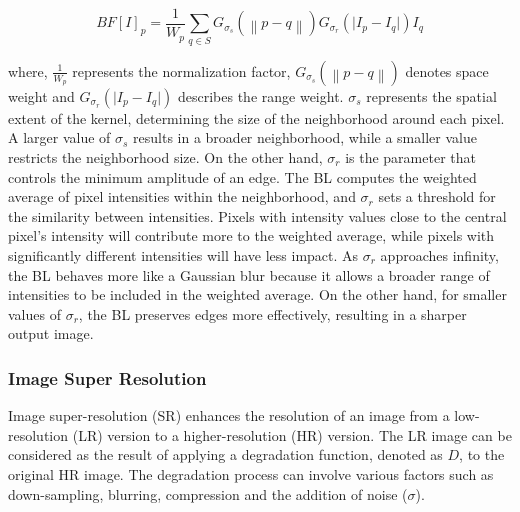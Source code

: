\documentclass[sn-mathphys]{sn-jnl}%
\theoremstyle{thmstyleone}%
\theoremstyle{thmstyletwo}%
\theoremstyle{thmstylethree}%
\begin{document}
 \begin{equation} \label{bl:eq:1}
  BF[I]_p = \frac{1}{W_p} \sum_{q \in S} G_{\sigma_s} (\left\| p - q \right\| ) G_{\sigma_r} ( \lvert I_p - I_q \rvert ) I_q
 \end{equation}
 
 where, $\frac{1}{W_p}$ represents the normalization factor,  $G_{\sigma_s} (\left\| p - q \right\| )$ denotes space weight and $G_{\sigma_r} ( \lvert I_p - I_q \rvert )$ describes the range weight. $\sigma_s$ represents the spatial extent of the kernel, determining the size of the neighborhood around each pixel. A larger value of $\sigma_s$ results in a broader neighborhood, while a smaller value restricts the neighborhood size. On the other hand, $\sigma_r$ is the parameter that controls the minimum amplitude of an edge. %
 The BL computes the weighted average of pixel intensities within the neighborhood, and $\sigma_r$ sets a threshold for the similarity between intensities. Pixels with intensity values close to the central pixel's intensity will contribute more to the weighted average, while pixels with significantly different intensities will have less impact. As $\sigma_r$ approaches infinity, the BL behaves more like a Gaussian blur because it allows a broader range of intensities to be included in the weighted average. On the other hand, for smaller values of $\sigma_r$, the BL preserves edges more effectively, resulting in a sharper output image.



 
 
\subsubsection{Image Super Resolution}
Image super-resolution (SR) enhances the resolution of an image from a low-resolution (LR) version to a higher-resolution (HR) version. The LR image can be considered as the result of applying a degradation function, denoted as $D$, to the original HR image. The degradation process can involve various factors such as down-sampling, blurring, compression and the addition of noise ($\sigma$).
\end{document}

